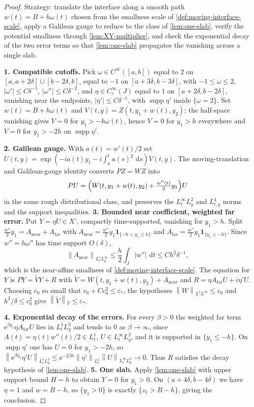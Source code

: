 \documentclass[11pt,oneside]{book}
\providecommand{\uses}[1]{}
\theoremstyle{definition}
\theoremstyle{remark}
\newcommand{\supp}{\operatorname{supp}}
\newcommand{\1}{\mathbf 1}
\newcommand{\dd}{\,\mathrm d}
\newcommand{\norm}[1]{\left\lVert #1\right\rVert}
\newcommand{\e}{\mathrm e}
\newcommand{\eps}{\varepsilon}
\begin{document}
\begin{proof}
\uses{lem:one-slab, lem:XY-multiplier, lem:moving-galilean-distribution, lem:moment-error, def:moving-interface-scale}
Strategy: translate the interface along a smooth path $w(t)=B+h\omega(t)$ chosen from the smallness scale of \cref{def:moving-interface-scale}, apply a Galilean gauge to reduce to the class of \cref{lem:one-slab}, verify the potential smallness through \cref{lem:XY-multiplier}, and check the exponential decay of the two error terms so that \cref{lem:one-slab} propagates the vanishing across a single slab.

\textbf{1. Compatible cutoffs.} Pick $\omega\in C^\infty([a,b])$ equal to $2$ on $[a,a+2\delta]\cup[b-2\delta,b]$, equal to $-1$ on $[a+3\delta,b-3\delta]$, with $-1\le\omega\le2$, $|\omega'|\le C\delta^{-1}$, $|\omega''|\le C\delta^{-2}$, and $\eta\in C_c^\infty(J)$ equal to $1$ on $[a+2\delta,b-2\delta]$, vanishing near the endpoints, $|\eta'|\le C\delta^{-1}$, with $\supp\eta'$ inside $\{\omega=2\}$. Set $w(t)=B+h\omega(t)$ and $V(t,y)=Z(t,y_1+w(t),y_2)$; the half-space vanishing gives $V=0$ for $y_1>-h\omega(t)$, hence $V=0$ for $y_1>h$ everywhere and $V=0$ for $y_1>-2h$ on $\supp\eta'$.

\textbf{2. Galilean gauge.} With $a(t)=w'(t)/2$ set $U(t,y)=\exp(-ia(t)y_1-i\int_a^t a(s)^2\,\dd s)V(t,y)$. The moving-translation and Galilean-gauge identity converts $PZ=WZ$ into
\[
 PU=\Bigl(W(t,y_1+w(t),y_2)+\tfrac{w''(t)}2 y_1\Bigr)U
\]
in the same rough distributional class, and preserves the $L^\infty_tL^2_y$ and $L^4_{t,y}$ norms and the support inequalities.
\textbf{3. Bounded near coefficient, weighted far error.} Put $Y=\eta U\in X'$, compactly time-supported, vanishing for $y_1>h$. Split $\tfrac{w''}2 y_1=A_{\mathrm{near}}+A_{\mathrm{far}}$ with $A_{\mathrm{near}}=\tfrac{w''}2 y_1\1_{\{-h<y_1\le h\}}$ and $A_{\mathrm{far}}=\tfrac{w''}2 y_1\1_{\{y_1\le-h\}}$. Since $w''=h\omega''$ has time support $O(\delta)$,
\[
 \norm{A_{\mathrm{near}}}_{L^1_tL^\infty_y}\le\frac h2\int_J|w''|\,\dd t\le C h^2\delta^{-1},
\]
which is the near-affine smallness of \cref{def:moving-interface-scale}. The equation for $Y$ is $PY=\widetilde V Y+R$ with $\widetilde V=W(t,y_1+w(t),y_2)+A_{\mathrm{near}}$ and $R=\eta A_{\mathrm{far}}U+i\eta'U$. Choosing $c_0$ so small that $c_0+Cc_0^2\le\eps_*$, the hypotheses $\norm{W}_{L^1L^\infty}\le c_0$ and $h^2/\delta\le c_0^2$ give $\norm{\widetilde V}_Y\le\eps_*$.

\textbf{4. Exponential decay of the errors.} For every $\beta>0$ the weighted far term $\e^{\beta y_1}\eta A_{\mathrm{far}}U$ lies in $L^1_tL^2_y$ and tends to $0$ as $\beta\to\infty$, since $A(t)=\eta(t)w''(t)/2\in L^1_t$, $U\in L^\infty_tL^2_y$, and it is supported in $\{y_1\le-h\}$. On $\supp\eta'$ one has $U=0$ for $y_1>-2h$, so $\norm{\e^{\beta y_1}\eta'U}_{L^1_tL^2_y}\le\e^{-2\beta h}\norm{\eta'}_{L^1_t}\norm{U}_{L^\infty_tL^2_y}\to0$. Thus $R$ satisfies the decay hypothesis of \cref{lem:one-slab}.
\textbf{5. One slab.} Apply \cref{lem:one-slab} with upper support bound $H=h$ to obtain $Y=0$ for $y_1>0$. On $(a+4\delta,b-4\delta)$ we have $\eta=1$ and $w=B-h$, so $\{y_1>0\}$ is exactly $\{z_1>B-h\}$, giving the conclusion.


\end{proof}
\end{document}
